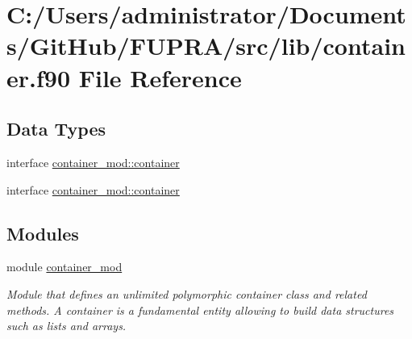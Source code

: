 \hypertarget{container_8f90}{}\section{C\+:/\+Users/administrator/\+Documents/\+Git\+Hub/\+F\+U\+P\+R\+A/src/lib/container.f90 File Reference}
\label{container_8f90}
\subsection*{Data Types}
\begin{DoxyCompactItemize}
\item 
interface \hyperlink{structcontainer__mod_1_1container}{container\+\_\+mod\+::container}
\item 
interface \hyperlink{structcontainer__mod_1_1container}{container\+\_\+mod\+::container}
\end{DoxyCompactItemize}
\subsection*{Modules}
\begin{DoxyCompactItemize}
\item 
module \hyperlink{namespacecontainer__mod}{container\+\_\+mod}
\begin{DoxyCompactList}\small\item\em Module that defines an unlimited polymorphic container class and related methods. A container is a fundamental entity allowing to build data structures such as lists and arrays. \end{DoxyCompactList}\end{DoxyCompactItemize}
